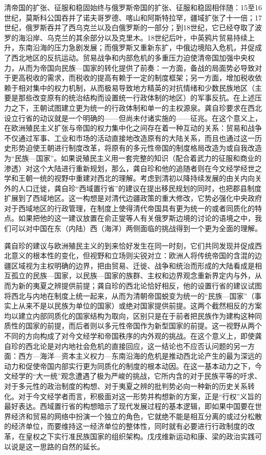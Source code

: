 \documentclass[a4paper, 12pt, openright]{ctexbook}
\begin{document}
清帝国的扩张、征服和稳固始终与俄罗斯帝国的扩张、征服和稳固相伴随：15至16世纪，莫斯科公国吞并了诺夫哥罗德、喀山和阿斯特拉罕，疆域扩张了十一倍；17世纪，俄罗斯吞并了西乌克兰以及白俄罗斯的一部分；到18世纪，它已经夺取了波罗的海沿岸、乌克兰的其余部分以及克里木。18世纪后叶，中英鸦片贸易持续上升，东南沿海的压力急剧发展；而俄罗斯又重新东扩，中俄边境陷入危机，并促成了西北地区的反抗运动。贸易战争和内部危机的多重压力迫使清帝国加强中央权力，从而为帝国向民族—国家的转化提供了前奏：一方面，备战的局面势必导致对于更高税收的需求，而税收的提高有赖于一定的制度框架；另一方面，增加税收依赖于相对集中的权力机制，从而极易导致地方精英的对抗情绪和少数民族地区（主要是那些改变原有的统治结构而设置统一行政体制的地区）的军事反抗。在上述压力之下，王朝试图建立更为统一的行政体制和单一的主权源泉。龚自珍要求在西北设立行省的动议就是一个明确的——但尚未付诸实施的——征兆。在这个意义上，在欧洲殖民主义扩张与帝国的权力集中化之间存在着一种互动的关系：贸易和战争不仅通过军事、工业和市场的活动直接地改造原有的大陆关系，而且也通过这一历史形势迫使王朝进行制度改革，将原有的多元性帝国的制度格局改造为或自我改造为“民族—国家”。如果说殖民主义用一套完整的知识（配合着武力的征服和商业的渗透）对这个大陆进行重新规划，那么，龚自珍和他的追随者则在今文经学经世之学和王朝一统的视野中重建对西北的理解。考虑到清初以降持续发展的由关内向关外的人口迁徙，龚自珍“西域置行省”的建议在提出移民规划的同时，也把郡县制度扩展到了西域地区。这一构想是对清代边疆政策的重大修改，它势必强化中央政府对于西域地区的行政管理，在制度上使得清代帝国具有更为统一的或者同质化的特点。如果把他的这一建议放置在俞正燮等人有关俄罗斯边境的讨论的语境之中，我们可以对中国在东（内陆）西（海洋）两侧面临的挑战得到一个更为全面的理解。

龚自珍的建议与欧洲殖民主义的到来恰好发生在同一时刻，它们共同发现并促成西北意义的根本性的变化，但视野和立场则尖锐对立：欧洲人将传统帝国的含混的边疆区域视为主权明确的边界，把由贸易、迁徙、战争和统治而形成的大陆看成是相互孤立的民族—国家，以民族—国家的族群、主权和边界观念重新界定内与外，从而为新的夷夏之辨提供前提；龚自珍的西北论恰好相反，他的设置行省的建议试图将西北与内地在制度上统一起来，从而为清朝帝国蜕变为统一的“民族—国家”（事实上从来不是以民族为单位的国家）或绝对国家提供前提。这两个截然相反的方案均以建立内部同质化的国家结构为取向，区别只是在于前者把民族作为建构这种同质性的国家的前提，而后者则以多元性帝国作为新型国家的前提。这一视野从两个不同的方向构成了对今文经学和帝国秩序的内外观的挑战。在这个意义上，即使龚自珍的西北论是对内地社会危机的直接回应，这一结论也不应否认问题的另一方面：西方—海洋—资本主义权力—东南沿海的危机是推动西北论产生的最为深远的动力和促使帝国内部实行更为同质化的制度的根本动因。在这一基本动力之下，今文经学的“大一统”观念遭遇了极为严峻的挑战，它所内含的对于民族平等的吁求、对于多元性的政治制度的构想、对于夷夏之辨的批判势必向一种新的历史关系转化。对于今文经学者而言，积极面对这一形势并构想新的方案，正是“行权”义旨的最好表达。西域置行省的构想暗示了现代发展过程的基本逻辑，即如果中国要在世界经济和贸易的网络中扮演一个独立的角色，它就绝不能是相互分离的或过分松散的经济单位，而要维持这一经济单位的整体性，同时就有必要进行行政制度的改革，在皇权之下实行准民族国家的组织架构。戊戌维新运动和康、梁的政治实践可以说是这一思路的自然的延长。
\end{document}
